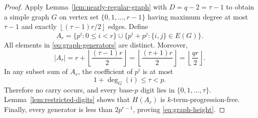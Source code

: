 \documentclass[10pt,a4paper]{amsart}
\numberwithin{equation}{section}
\newcommand{\floor}[1]{\left\lfloor #1\right\rfloor}
\begin{document}
\begin{proof}
Apply Lemma~\ref{lem:nearly-regular-graph} with $D=q-2=\tau-1$ to obtain a simple graph $G$ on vertex set $\{0,1,\ldots,r-1\}$ having maximum degree at most $\tau-1$ and exactly $\floor{(\tau-1)r/2}$ edges. Define
\begin{equation}\label{eq:graph-generators}
A_r=\{p^i:0\le i<r\}
 \cup\{p^i+p^j:\{i,j\}\in E(G)\}.
\end{equation}
All elements in \eqref{eq:graph-generators} are distinct. Moreover,
\[
|A_r|=r+\floor{\frac{(\tau-1)r}{2}}
 =\floor{\frac{(\tau+1)r}{2}}
 =\floor{\frac{qr}{2}}.
\]
In any subset sum of $A_r$, the coefficient of $p^i$ is at most
\[
1+\deg_G(i)\le\tau<p.
\]
Therefore no carry occurs, and every base-$p$ digit lies in $\{0,1,\ldots,\tau\}$. Lemma~\ref{lem:restricted-digits} shows that $H(A_r)$ is $k$-term-progression-free. Finally, every generator is less than $2p^{r-1}$, proving \eqref{eq:graph-height}.
\end{proof}
\end{document}
